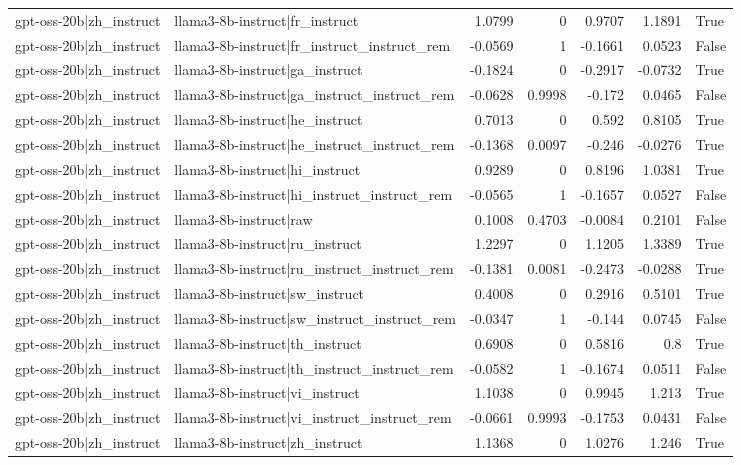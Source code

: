 \begin{table}
\begin{tabular}{l l r r r r l}
gpt-oss-20b|zh_instruct & llama3-8b-instruct|fr_instruct & 1.0799 & 0 & 0.9707 & 1.1891 & True \\
gpt-oss-20b|zh_instruct & llama3-8b-instruct|fr_instruct_instruct_rem & -0.0569 & 1 & -0.1661 & 0.0523 & False \\
gpt-oss-20b|zh_instruct & llama3-8b-instruct|ga_instruct & -0.1824 & 0 & -0.2917 & -0.0732 & True \\
gpt-oss-20b|zh_instruct & llama3-8b-instruct|ga_instruct_instruct_rem & -0.0628 & 0.9998 & -0.172 & 0.0465 & False \\
gpt-oss-20b|zh_instruct & llama3-8b-instruct|he_instruct & 0.7013 & 0 & 0.592 & 0.8105 & True \\
gpt-oss-20b|zh_instruct & llama3-8b-instruct|he_instruct_instruct_rem & -0.1368 & 0.0097 & -0.246 & -0.0276 & True \\
gpt-oss-20b|zh_instruct & llama3-8b-instruct|hi_instruct & 0.9289 & 0 & 0.8196 & 1.0381 & True \\
gpt-oss-20b|zh_instruct & llama3-8b-instruct|hi_instruct_instruct_rem & -0.0565 & 1 & -0.1657 & 0.0527 & False \\
gpt-oss-20b|zh_instruct & llama3-8b-instruct|raw & 0.1008 & 0.4703 & -0.0084 & 0.2101 & False \\
gpt-oss-20b|zh_instruct & llama3-8b-instruct|ru_instruct & 1.2297 & 0 & 1.1205 & 1.3389 & True \\
gpt-oss-20b|zh_instruct & llama3-8b-instruct|ru_instruct_instruct_rem & -0.1381 & 0.0081 & -0.2473 & -0.0288 & True \\
gpt-oss-20b|zh_instruct & llama3-8b-instruct|sw_instruct & 0.4008 & 0 & 0.2916 & 0.5101 & True \\
gpt-oss-20b|zh_instruct & llama3-8b-instruct|sw_instruct_instruct_rem & -0.0347 & 1 & -0.144 & 0.0745 & False \\
gpt-oss-20b|zh_instruct & llama3-8b-instruct|th_instruct & 0.6908 & 0 & 0.5816 & 0.8 & True \\
gpt-oss-20b|zh_instruct & llama3-8b-instruct|th_instruct_instruct_rem & -0.0582 & 1 & -0.1674 & 0.0511 & False \\
gpt-oss-20b|zh_instruct & llama3-8b-instruct|vi_instruct & 1.1038 & 0 & 0.9945 & 1.213 & True \\
gpt-oss-20b|zh_instruct & llama3-8b-instruct|vi_instruct_instruct_rem & -0.0661 & 0.9993 & -0.1753 & 0.0431 & False \\
gpt-oss-20b|zh_instruct & llama3-8b-instruct|zh_instruct & 1.1368 & 0 & 1.0276 & 1.246 & True \\

\end{tabular}
\end{table}
